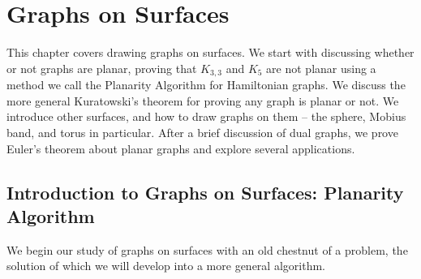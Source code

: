 \documentclass[10pt,]{book}
\theoremstyle{plain}
\theoremstyle{definition}
\theoremstyle{definition}
\theoremstyle{definition}
\theoremstyle{definition}
\numberwithin{equation}{section}
\begin{document}
\chapter[{Graphs on Surfaces}]{Graphs on Surfaces}\label{ch_graphs_on_surfaces}
\hypertarget{p-273}{}%
This chapter covers drawing graphs on surfaces.  We start with discussing whether or not graphs are planar, proving that \(K_{3,3}\) and \(K_5\) are not planar using a method we call the Planarity Algorithm for Hamiltonian graphs.  We discuss the more general Kuratowski's theorem for proving any graph is planar or not.  We introduce other surfaces, and how to draw graphs on them -- the sphere, Mobius band, and torus in particular.  After a brief discussion of dual graphs, we prove Euler's theorem about planar graphs and explore several applications.%
\typeout{************************************************}
\typeout{************************************************}
\section[{Introduction to Graphs on Surfaces: Planarity Algorithm}]{Introduction to Graphs on Surfaces: Planarity Algorithm}\label{s_graphs_on_surfaces_introduction_planarity}
\hypertarget{p-274}{}%
We begin our study of graphs on surfaces with an old chestnut of a problem, the solution of which we will develop into a more general algorithm.%
\typeout{************************************************}
\typeout{************************************************}
\end{document}
